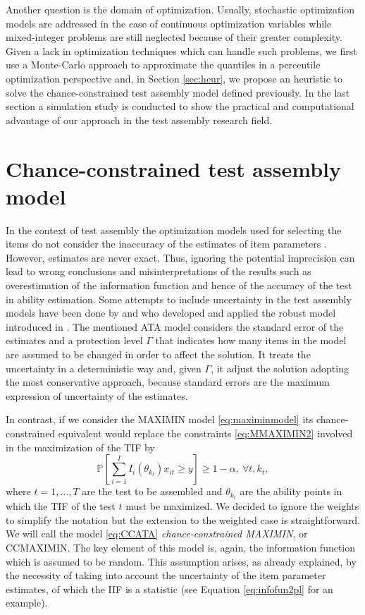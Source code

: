 Another question is the domain of optimization. Usually, stochastic optimization models are addressed in the case of continuous optimization variables while mixed-integer problems are still neglected because of their greater complexity. Given a lack in optimization techniques which can handle such problems, we first use a Monte-Carlo approach to approximate the quantiles in a percentile optimization perspective and, in Section \ref{sec:heur}, we propose an heuristic to solve the chance-constrained test assembly model defined previously. In the last section a simulation study is conducted to show the practical and computational advantage of our approach in the test assembly research field.

\section{Chance-constrained test assembly model}\label{sec:CCATA}

In the context of test assembly the optimization models used for selecting the items do not consider the inaccuracy of the estimates of item parameters \parencite{VDL2005}. However, estimates are never exact. Thus, ignoring the potential imprecision can lead to wrong conclusions and misinterpretations of the results such as overestimation of the information function and hence of the accuracy of the test in ability estimation. Some attempts to include uncertainty in the test assembly models have been done by \textcite{veldkamp2013application} and \textcite{veldkamp2013uncertainties} who developed and applied the robust model introduced in \textcite{bertsimas2003robust}. The mentioned ATA model considers the standard error of the estimates and a protection level $\Gamma$ that indicates how many items in the model are assumed to be changed in order to affect the solution. It treats the uncertainty in a deterministic way and, given $\Gamma$, it adjust the solution adopting the most conservative approach, because standard errors are the maximum expression of uncertainty of the estimates.

In contrast, if we consider the MAXIMIN model \eqref{eq:maximinmodel} its chance-constrained equivalent would replace the constraints \eqref{eq:MMAXIMIN2} involved in the maximization of the TIF by 
\begin{equation}\label{eq:CCATA}
\mathbb{P}\left[\sum_{i=1}^I I_i(\theta_{k_t}) x_{it} \ge y \right] \geq 1-\alpha , \ \forall t,k_t,
\end{equation}
\noindent where $t=1,\ldots,T$ are the test to be assembled and $\theta_{k_t}$ are the ability points in which the TIF of the test $t$ must be maximized. We decided to ignore the weights to simplify the notation but the extension to the weighted case is straightforward. We will call the model \eqref{eq:CCATA} \emph{chance-constrained MAXIMIN}, or CCMAXIMIN. The key element of this model is, again, the information function which is assumed to be random. This assumption arises, as already explained, by the necessity of taking into account the uncertainty of the item parameter estimates, of which the IIF is a statistic (see Equation \eqref{eq:infofun2pl} for an example).

